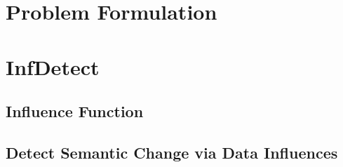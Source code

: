 
\section{Problem Formulation}


\section{InfDetect}

\subsection{Influence Function}

\subsection{Detect Semantic Change via Data Influences}

